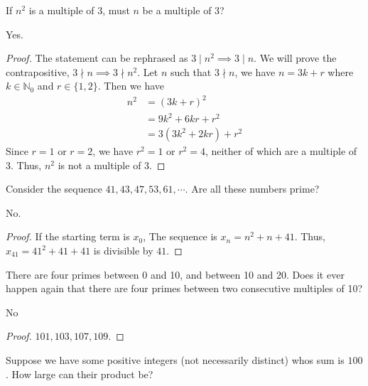\documentclass[12pt]{article}
\begin{document}
\begin{question}
    If $n^{2}$ is a multiple of $3$, must $n$ be a multiple of $3$?
\end{question}
Yes.
\begin{proof}
    The statement can be rephrased as $3 \mid n^{2} \implies 3 \mid n$.
    We will prove the contrapositive, $3 \nmid n \implies 3 \nmid n^{2}$.
    Let $n$ such that $3 \nmid n$, we have $n = 3k + r$
    where $k \in \mathbb{N}_0$ and $r \in \{1,2\}$.
    Then we have
    \begin{align*}
        n^{2} &= (3k + r)^{2}\\
              &= 9k^{2} + 6kr + r^{2}\\
              &= 3(3k^{2} + 2kr) + r^{2}
    \end{align*}
    Since $r = 1$ or $r = 2$, we have $r^{2} = 1$ or $r^{2} = 4$,
    neither of which are a multiple of $3$.
    Thus, $n^{2}$ is not a multiple of $3$.
\end{proof}


\begin{question}
    Consider the sequence $41,43,47,53,61,\cdots$.
    Are all these numbers prime?
\end{question}
No.
\begin{proof}
    If the starting term is $x_{0}$, The sequence is $x_n = n^{2} + n + 41$.
    Thus, $x_{41} = 41^{2} + 41 + 41$ is divisible by $41$.
\end{proof}

\begin{question}
    There are four primes between 0 and 10,
    and between 10 and 20.
    Does it ever happen again that there are 
    four primes between two consecutive multiples of 10?
\end{question}
No
\begin{proof}
    $101,103,107,109$.
\end{proof}

\begin{question}
    Suppose we have some positive integers (not necessarily distinct)
    whos sum is $100$. How large can their product be?
\end{question}
\end{document}
